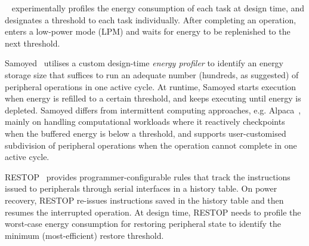 \debs{}~\cite{gomez2016dynamic} experimentally profiles the energy consumption of each task at design time, and designates a threshold to each task individually.
After completing an operation, \debs{} enters a low-power mode (LPM) and waits for energy to be replenished to the next threshold. 

Samoyed~\cite{maeng2019supporting} utilises a custom design-time \textit{energy profiler} to identify an energy storage size that suffices to run an adequate number (hundreds, as suggested) of peripheral operations in one active cycle. 
At runtime, Samoyed starts execution when energy is refilled to a certain threshold, and keeps executing until energy is depleted. 
Samoyed differs from  intermittent computing approaches, e.g. Alpaca~\cite{maeng2017alpaca}, mainly on handling computational workloads where it reactively checkpoints when the buffered energy is below a threshold, and supports user-customised subdivision of peripheral operations when the operation cannot complete in one active cycle. 

RESTOP~\cite{rodriguez2018restop} provides programmer-configurable rules that track the instructions issued to peripherals through serial interfaces in a history table.
On power recovery, RESTOP re-issues instructions saved in the history table and then resumes the interrupted operation. 
At design time, RESTOP needs to profile the worst-case energy consumption for restoring peripheral state to identify the minimum (most-efficient) restore threshold. 



